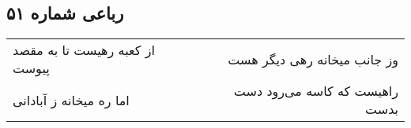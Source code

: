 \begin{center}
\section*{رباعی شماره ۵۱}
\label{sec:sh051}
\begin{longtable}{l p{0.5cm} r}
از کعبه رهیست تا به مقصد پیوست
&&
وز جانب میخانه رهی دیگر هست
\\
اما ره میخانه ز آبادانی
&&
راهیست که کاسه می‌رود دست بدست
\\
\end{longtable}
\end{center}
